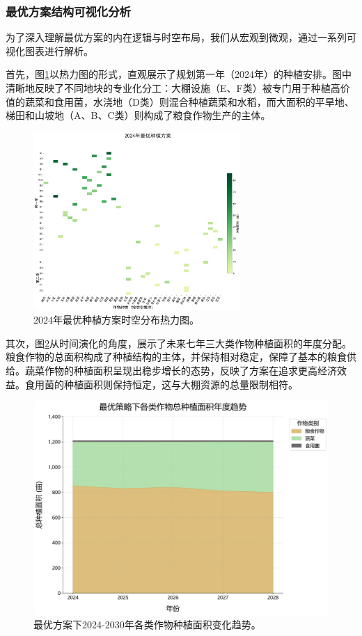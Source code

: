 \subsubsection{最优方案结构可视化分析}
为了深入理解最优方案的内在逻辑与时空布局，我们从宏观到微观，通过一系列可视化图表进行解析。

首先，图\ref{fig:optimal_solution_2024}以热力图的形式，直观展示了规划第一年（2024年）的种植安排。图中清晰地反映了不同地块的专业化分工：大棚设施（E、F类）被专门用于种植高价值的蔬菜和食用菌，水浇地（D类）则混合种植蔬菜和水稻，而大面积的平旱地、梯田和山坡地（A、B、C类）则构成了粮食作物生产的主体。

\begin{figure}[H]
    \centering
    \includegraphics[width=0.7\textwidth]{figs/5问题三/2024年最优种植方案.png}
    \caption{2024年最优种植方案时空分布热力图。}
    \label{fig:optimal_solution_2024}
\end{figure}

其次，图\ref{fig:area_stack}从时间演化的角度，展示了未来七年三大类作物种植面积的年度分配。粮食作物的总面积构成了种植结构的主体，并保持相对稳定，保障了基本的粮食供给。蔬菜作物的种植面积呈现出稳步增长的态势，反映了方案在追求更高经济效益。食用菌的种植面积则保持恒定，这与大棚资源的总量限制相符。

\begin{figure}[H]
    \centering
    \includegraphics[width=\textwidth]{figs/5问题三/年度种植面积堆叠图_最终参考版.png}
    \caption{最优方案下2024-2030年各类作物种植面积变化趋势。}
    \label{fig:area_stack}
\end{figure}

